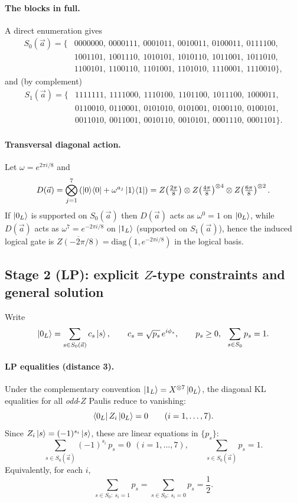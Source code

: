 \documentclass[11pt]{article}
\begin{document}
\paragraph{The blocks in full.}
A direct enumeration gives
\[
\begin{aligned}
S_0(\vec a)=\{&
0000000,\ 0000111,\ 0001011,\ 0010011,\ 0100011,\ 0111100,\\
&1001101,\ 1001110,\ 1010101,\ 1010110,\ 1011001,\ 1011010,\\
&1100101,\ 1100110,\ 1101001,\ 1101010,\ 1110001,\ 1110010
\},
\end{aligned}
\]
and (by complement)
\[
\begin{aligned}
S_1(\vec a)=\{&
1111111,\ 1111000,\ 1110100,\ 1101100,\ 1011100,\ 1000011,\\
&0110010,\ 0110001,\ 0101010,\ 0101001,\ 0100110,\ 0100101,\\
&0011010,\ 0011001,\ 0010110,\ 0010101,\ 0001110,\ 0001101
\}.
\end{aligned}
\]

\paragraph{Transversal diagonal action.}
Let $\omega=e^{2\pi i/8}$ and
\[
D(\vec a)=\bigotimes_{j=1}^7\left(\ket{0}\!\bra{0}+\omega^{a_j}\ket{1}\!\bra{1}\right)
=
Z\!\left(\tfrac{2\pi}{8}\right)\otimes
Z\!\left(\tfrac{4\pi}{8}\right)^{\otimes 4}\otimes
Z\!\left(\tfrac{6\pi}{8}\right)^{\otimes 2}.
\]
If $\ket{0_L}$ is supported on $S_0(\vec a)$ then $D(\vec a)$ acts as $\omega^{0}=1$ on $\ket{0_L}$, while
$D(\vec a)$ acts as $\omega^{7}=e^{-2\pi i/8}$ on $\ket{1_L}$ (supported on $S_1(\vec a)$), hence the induced
logical gate is $\overline{Z(-2\pi/8)}=\mathrm{diag}(1,e^{-2\pi i/8})$ in the logical basis.

\subsection{Stage 2 (LP): explicit $Z$-type constraints and general solution}

Write
\[
\ket{0_L}=\sum_{s\in S_0(\vec a)} c_s \ket{s},
\qquad
c_s=\sqrt{p_s}\,e^{i\phi_s},
\qquad
p_s\ge 0,\ \ \sum_{s\in S_0}p_s=1.
\]

\paragraph{LP equalities (distance 3).}
Under the complementary convention $\ket{1_L}=X^{\otimes 7}\ket{0_L}$, the diagonal KL equalities
for all \emph{odd}-$Z$ Paulis reduce to vanishing:
\[
\bra{0_L}Z_i\ket{0_L}=0\qquad (i=1,\dots,7).
\]
Since $Z_i\ket{s}=(-1)^{s_i}\ket{s}$, these are linear equations in $\{p_s\}$:
\[
\boxed{\ \sum_{s\in S_0(\vec a)} (-1)^{s_i}\,p_s = 0\ \ (i=1,\dots,7),\qquad \sum_{s\in S_0(\vec a)}p_s=1.\ }
\]
Equivalently, for each $i$,
\[
\sum_{s\in S_0:\ s_i=1} p_s=\sum_{s\in S_0:\ s_i=0} p_s=\frac12.
\]
\end{document}
